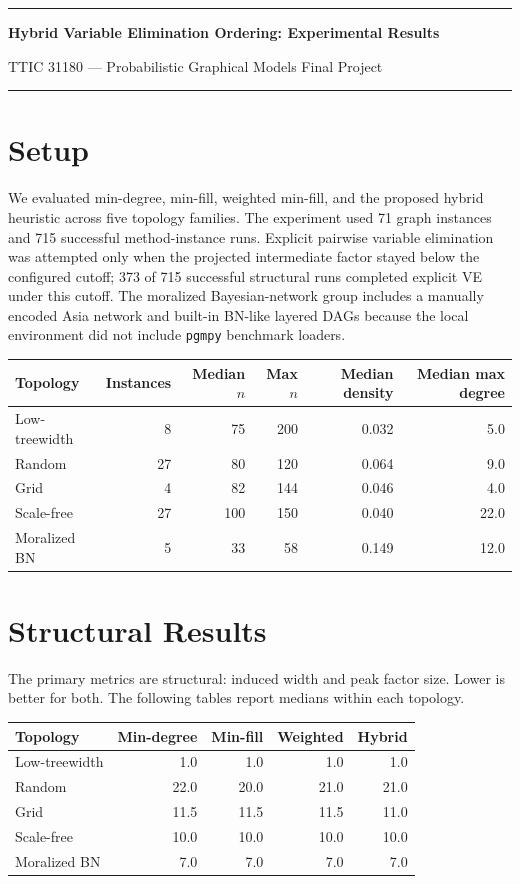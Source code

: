 \documentclass[10pt]{article}
\begin{document}
{\color{accent}\rule{\linewidth}{1.2pt}}

{\Large\bfseries Hybrid Variable Elimination Ordering: Experimental Results}

{TTIC 31180 --- Probabilistic Graphical Models Final Project}

{\color{accent}\rule{\linewidth}{0.8pt}}

\section*{Setup}
We evaluated min-degree, min-fill, weighted min-fill, and the proposed hybrid heuristic across five topology families. The experiment used 71 graph instances and 715 successful method-instance runs. Explicit pairwise variable elimination was attempted only when the projected intermediate factor stayed below the configured cutoff; 373 of 715 successful structural runs completed explicit VE under this cutoff. The moralized Bayesian-network group includes a manually encoded Asia network and built-in BN-like layered DAGs because the local environment did not include \texttt{pgmpy} benchmark loaders.

\begin{center}
\begin{tabular}{lrrrrr}
\toprule
\textbf{Topology} & \textbf{Instances} & \textbf{Median $n$} & \textbf{Max $n$} & \textbf{Median density} & \textbf{Median max degree} \\
\midrule
Low-treewidth & 8 & 75 & 200 & 0.032 & 5.0 \\
Random & 27 & 80 & 120 & 0.064 & 9.0 \\
Grid & 4 & 82 & 144 & 0.046 & 4.0 \\
Scale-free & 27 & 100 & 150 & 0.040 & 22.0 \\
Moralized BN & 5 & 33 & 58 & 0.149 & 12.0 \\
\bottomrule
\end{tabular}
\end{center}

\section*{Structural Results}
The primary metrics are structural: induced width and peak factor size. Lower is better for both. The following tables report medians within each topology.

\begin{center}
{\small
\begin{tabular}{lrrrr}
\toprule
\textbf{Topology} & \textbf{Min-degree} & \textbf{Min-fill} & \textbf{Weighted} & \textbf{Hybrid} \\
\midrule
Low-treewidth & 1.0 & 1.0 & 1.0 & 1.0 \\
Random & 22.0 & 20.0 & 21.0 & 21.0 \\
Grid & 11.5 & 11.5 & 11.5 & 11.0 \\
Scale-free & 10.0 & 10.0 & 10.0 & 10.0 \\
Moralized BN & 7.0 & 7.0 & 7.0 & 7.0 \\
\bottomrule
\end{tabular}
}
\end{center}
\end{document}

